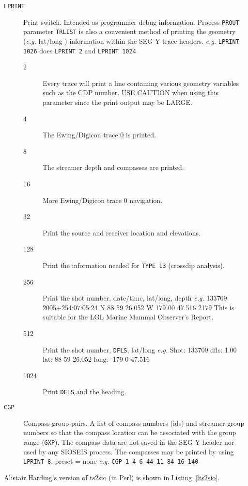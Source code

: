 \begin{description}
\item[\texttt{LPRINT}] Print switch.  Intended as programmer debug information.
         Process \texttt{PROUT} parameter \texttt{TRLIST} is also a convenient method of printing
         the geometry (\textit{e.g.} lat/long ) information within the SEG-Y trace
         headers.  \textit{e.g.} \texttt{LPRINT 1026}    does \texttt{LPRINT 2} and \texttt{LPRINT 1024}
\begin{description}
     \item[2] Every trace will print a line containing various geometry variables such as the CDP number.  USE CAUTION when using this parameter since the print output may be LARGE.
\item[4] The Ewing/Digicon trace 0 is printed.
\item[8] The streamer depth and compasses are printed.
\item[16] More Ewing/Digicon trace 0 navigation.
\item[32] Print the source and receiver location and elevations.
\item[128] Print the information needed for \texttt{TYPE 13} (crossdip analysis).
\item[256] Print the \gls{shot} number, date/time, lat/long, depth        \textit{e.g.} 133709 2005+254:07:05:24 N 88 59 26.052 W 179 00 47.516 2179 This is suitable for the LGL Marine Mammal Observer's Report.
\item[512] Print the \gls{shot} number, \texttt{DFLS}, lat/long          \textit{e.g.} Shot:  133709 dfls:     1.00 lat:   88 59 26.052 long: -179  0 47.516 
\item[1024] Print \texttt{DFLS} and the heading.
\end{description}

\item[\texttt{CGP}] Compass-group-pairs.  A list of compass numbers (ids) and
         streamer group numbers so that the compass location can be
         associated with the group range (\texttt{GXP}).  The compass data are
         not saved in the SEG-Y header nor used by any SIOSEIS process.
         The compasses may be printed by using \texttt{LPRINT 8}.
         \Gls{preset} = none    \textit{e.g.} \texttt{CGP 1 4 6 44 11 84 16 140}
\end{description}

Alistair Harding's version of ts2sio (in Perl) is shown in
Listing~\ref{lts2sio}.

